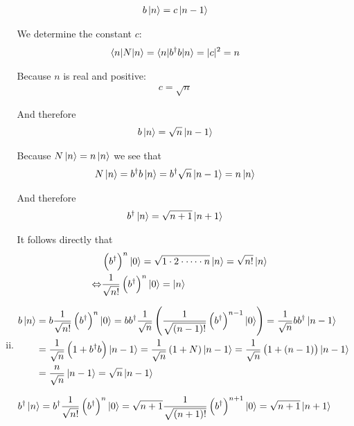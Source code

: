 \documentclass[a4paper,german,12pt,smallheadings]{scrartcl}
\begin{document}
\begin{enumerate}[a)]
\begin{enumerate}[i)]
    \begin{align*}
      b \ket{n} = c \ket{n-1}
    \end{align*}

    We determine the constant $c$:
    \begin{align*}
      \braket{n|N|n} = \braket{n|b^\dagger b|n} = |c|^2 = n
    \end{align*}

    Because $n$ is real and positive:
    \begin{align*}
      c = \sqrt{n}
    \end{align*}

    And therefore
    \begin{align*}
      b \ket{n} = \sqrt{n} \ket{n-1}
    \end{align*}

    Because $N \ket{n} = n \ket{n}$ we see that
    \begin{align*}
      N \ket{n} = b^\dagger b \ket{n} = b^\dagger \sqrt{n} \ket{n-1} = n \ket{n}
    \end{align*}

    And therefore
    \begin{align*}
      b^\dagger \ket{n} = \sqrt{n+1} \ket{n+1}
    \end{align*}

    It follows directly that
    \begin{align*}
      &\del{b^\dagger }^n \ket{0} = \sqrt{1\cdot2\cdot\dots\cdot n} \ket{n} = \sqrt{n!} \ket{n} \\
      \quad\Leftrightarrow &\frac{1}{\sqrt{n!}} \del{b^\dagger }^n \ket{0} = \ket{n}
    \end{align*}

  \item
    \begin{align*}
      b \ket{n}
      &= b \frac{1}{\sqrt{n!}} \del{b^\dagger}^n \ket{0} 
      = bb^\dagger \frac{1}{\sqrt{n}} \del{\frac{1}{\sqrt{(n-1)!}} \del{b^\dagger}^{n-1} \ket{0}} 
      = \frac{1}{\sqrt{n}} bb^\dagger \ket{n-1} \\
      &= \frac{1}{\sqrt{n}} \del{1 + b^\dagger b} \ket{n-1}
      = \frac{1}{\sqrt{n}} \del{1 + N} \ket{n-1}
      = \frac{1}{\sqrt{n}} \del{1 + (n-1)} \ket{n-1} \\
      &= \frac{n}{\sqrt{n}} \ket{n-1}
      = \sqrt{n} \ket{n-1}
    \end{align*}

    \begin{align*}
      b^\dagger \ket{n} 
      &= b^\dagger \frac{1}{\sqrt{n!}} \del{b^\dagger}^n \ket{0}
      = \sqrt{n+1} \frac{1}{\sqrt{(n+1)!}} \del{b^\dagger}^{n+1} \ket{0}
      = \sqrt{n+1} \ket{n+1}
    \end{align*}


\end{enumerate}
\end{enumerate}
\end{document}
